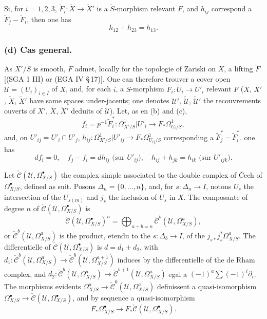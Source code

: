 \documentclass[12pt,a4paper]{article}
\theoremstyle{plain}
\theoremstyle{definition}
\theoremstyle{remark}
\begin{document}
Si, for $i = 1, 2, 3$, $\tilde{F}_i: \tilde{X} \to \tilde{X}'$ is a $\tilde{S}$-morphism relevant $F$, and $h_{ij}$ correspond a $\tilde{F}_j - \tilde{F}_i$, then one has
\begin{equation}\label{eq:5}
h_{12} + h_{23} = h_{13}.
\end{equation}

\subsubsection*{(d) Cas general.}

As $X'/S$ is smooth, $F$ admet, locally for the topologie of Zariski on $X$, a lifting $\tilde{F}$ [(SGA 1 III) or (EGA IV \S\,17)]. One can therefore trouver a cover open $\mathscr{U} = (U_i)_{i \in I}$ of $X$, and, for each $i$, a $\tilde{S}$-morphism $\tilde{F}_i: \tilde{U}_i \to \tilde{U}'_i$ relevant $F$ ($X$, $X'$, $\tilde{X}$, $\tilde{X}'$ have same spaces under-jacents; one denotes $\mathscr{U}'$, $\tilde{\mathscr{U}}$, $\tilde{\mathscr{U}}'$ the recouvrements ouverts of $X'$, $\tilde{X}$, $\tilde{X}'$ deduits of $\mathscr{U}$). Let, as en (b) and (c),
\[
f_i = p^{-1}\tilde{F}_i^*: \Omega^1_{X'/S}|U'_i \to F_* \Omega^1_{U_i/S},
\]
and, on $U'_{ij} = U'_i \cap U'_j$, $h_{ij}: \Omega^1_{X'/S}|U'_{ij} \to F_* \Omega^1_{U_{ij}/S}$ corresponding a $\tilde{F}_j^* - \tilde{F}_i^*$. one has
\begin{equation}\label{eq:6}
df_i = 0, \quad f_j - f_i = dh_{ij} \text{ (sur } U'_{ij}\text{)}, \quad h_{ij} + h_{jk} = h_{ik} \text{ (sur } U'_{ijk}\text{)}.
\end{equation}

Let $\check{\mathscr{C}}(\mathscr{U}, \Omega^{\bullet}_{X/S})$ the complex simple associated to the double complex of \v{C}ech of $\Omega^{\bullet}_{X/S}$, defined as suit. Posons $\Delta_n = \{0, \ldots, n\}$, and, for $s: \Delta_n \to I$, notons $U_s$ the intersection of the $U_{s(m)}$ and $j_s$ the inclusion of $U_s$ in $X$. The composante of degree $n$ of $\check{\mathscr{C}}(\mathscr{U}, \Omega^{\bullet}_{X/S})$ is
\[
\check{\mathscr{C}}(\mathscr{U}, \Omega^{\bullet}_{X/S})^n = \bigoplus_{a+b=n} \check{\mathscr{C}}^b(\mathscr{U}, \Omega^a_{X/S}),
\]
or $\check{\mathscr{C}}^b(\mathscr{U}, \Omega^a_{X/S})$ is the product, etendu to the $s: \Delta_b \to I$, of the $j_{s*} j_s^* \Omega^a_{X/S}$. The differentielle of $\check{\mathscr{C}}(\mathscr{U}, \Omega^{\bullet}_{X/S})$ is $d = d_1 + d_2$, with $d_1: \check{\mathscr{C}}^b(\mathscr{U}, \Omega^a_{X/S}) \to \check{\mathscr{C}}^b(\mathscr{U}, \Omega^{a+1}_{X/S})$ induces by the differentielle of the de Rham complex, and $d_2: \check{\mathscr{C}}^b(\mathscr{U}, \Omega^a_{X/S}) \to \check{\mathscr{C}}^{b+1}(\mathscr{U}, \Omega^a_{X/S})$ egal a $(-1)^a \sum (-1)^i \partial_i$. The morphisms evidents $\Omega^a_{X/S} \to \check{\mathscr{C}}^0(\mathscr{U}, \Omega^a_{X/S})$ definissent a quasi-isomorphism $\Omega^{\bullet}_{X/S} \to \check{\mathscr{C}}(\mathscr{U}, \Omega^{\bullet}_{X/S})$, and by sequence a quasi-isomorphism
\begin{equation}\label{eq:7}
F_* \Omega^{\bullet}_{X/S} \to F_* \check{\mathscr{C}}(\mathscr{U}, \Omega^{\bullet}_{X/S}).
\end{equation}
\end{document}
